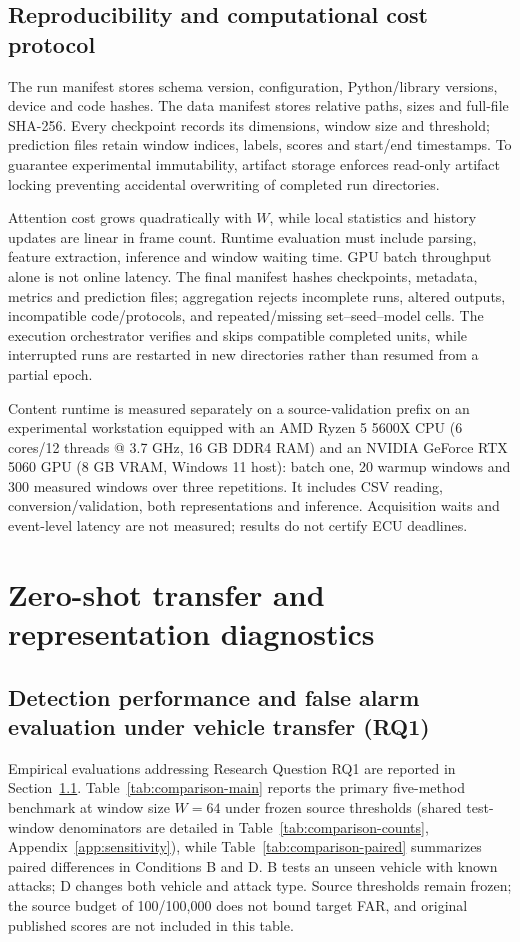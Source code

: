 \documentclass[12pt, a4paper, reqno, oneside]{book}
\begin{document}
\subsection{Reproducibility and computational cost protocol}
The run manifest stores schema version, configuration, Python/library versions, device and code hashes. The data manifest stores relative paths, sizes and full-file SHA-256. Every checkpoint records its dimensions, window size and threshold; prediction files retain window indices, labels, scores and start/end timestamps. To guarantee experimental immutability, artifact storage enforces read-only artifact locking preventing accidental overwriting of completed run directories.

Attention cost grows quadratically with $W$, while local statistics and history updates are linear in frame count. Runtime evaluation must include parsing, feature extraction, inference and window waiting time. GPU batch throughput alone is not online latency. The final manifest hashes checkpoints, metadata, metrics and prediction files; aggregation rejects incomplete runs, altered outputs, incompatible code/protocols, and repeated/missing set--seed--model cells. The execution orchestrator verifies and skips compatible completed units, while interrupted runs are restarted in new directories rather than resumed from a partial epoch.

Content runtime is measured separately on a source-validation prefix on an experimental workstation equipped with an AMD Ryzen 5 5600X CPU (6 cores/12 threads @ 3.7 GHz, 16 GB DDR4 RAM) and an NVIDIA GeForce RTX 5060 GPU (8 GB VRAM, Windows 11 host): batch one, 20 warmup windows and 300 measured windows over three repetitions. It includes CSV reading, conversion/validation, both representations and inference. Acquisition waits and event-level latency are not measured; results do not certify ECU deadlines.

\section{Zero-shot transfer and representation diagnostics}\label{sec:zeroshot-eval}
\subsection{Detection performance and false alarm evaluation under vehicle transfer (RQ1)}\label{sec:comparison-results}
Empirical evaluations addressing Research Question RQ1 are reported in Section~\ref{sec:comparison-results}. Table~\ref{tab:comparison-main} reports the primary five-method benchmark at window size $W=64$ under frozen source thresholds (shared test-window denominators are detailed in Table~\ref{tab:comparison-counts}, Appendix~\ref{app:sensitivity}), while Table~\ref{tab:comparison-paired} summarizes paired differences in Conditions B and D. B tests an unseen vehicle with known attacks; D changes both vehicle and attack type. Source thresholds remain frozen; the source budget of 100/100,000 does not bound target FAR, and original published scores are not included in this table.
\end{document}
